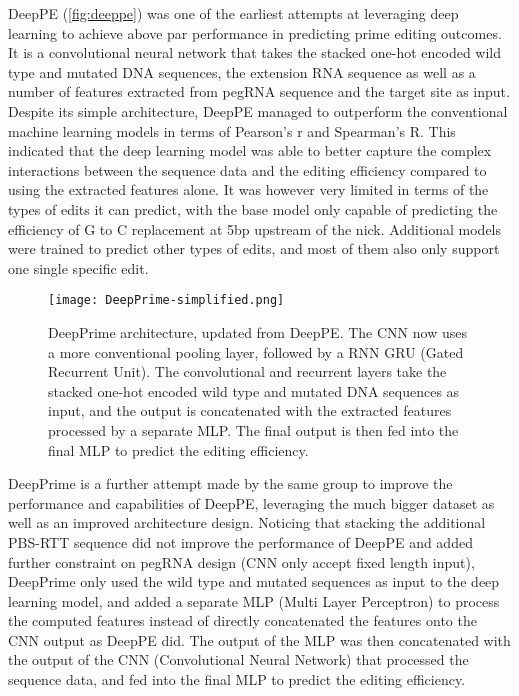 DeepPE (\autoref{fig:deeppe}) was one of the earliest attempts at leveraging deep learning to achieve above par performance in predicting prime editing outcomes\cite{kimPredictingEfficiencyPrime2021}. It is a convolutional neural network that takes the stacked one-hot encoded wild type and  mutated DNA sequences, the extension RNA sequence as well as a number of features extracted from pegRNA sequence and the target site as input. Despite its simple architecture, DeepPE managed to outperform the conventional machine learning models in terms of Pearson's r and Spearman's R. This indicated that the deep learning model was able to better capture the complex interactions between the sequence data and the editing efficiency compared to using the extracted features alone. It was however very limited in terms of the types of edits it can predict, with the base model only capable of predicting the efficiency of G to C replacement at 5bp upstream of the nick. Additional models were trained to predict other types of edits, and most of them also only support one single specific edit.

\begin{figure}
    \centering
    \texttt{[image: DeepPrime-simplified.png]}
    \caption[DeepPrime architecture]{DeepPrime architecture, updated from DeepPE. The CNN now uses a more conventional pooling layer, followed by a RNN GRU (Gated Recurrent Unit). The convolutional and recurrent layers take the stacked one-hot encoded wild type and mutated DNA sequences as input, and the output is concatenated with the extracted features processed by a separate MLP. The final output is then fed into the final MLP to predict the editing efficiency.}
    \label{fig:deepprime}
\end{figure}

DeepPrime is a further attempt made by the same group to improve the performance and capabilities of DeepPE, leveraging the much bigger dataset as well as an improved architecture design\cite{yuPredictionEfficienciesDiverse2023}.
Noticing that stacking the additional PBS-RTT sequence did not improve the performance of DeepPE and added further constraint on pegRNA design (CNN only accept fixed length input), DeepPrime only used the wild type and mutated sequences as input to the deep learning model, and added a separate MLP (Multi Layer Perceptron) to process the computed features instead of directly concatenated the features onto the CNN output as DeepPE did. The output of the MLP was then concatenated with the output of the CNN (Convolutional Neural Network) that processed the sequence data, and fed into the final MLP to predict the editing efficiency. 

